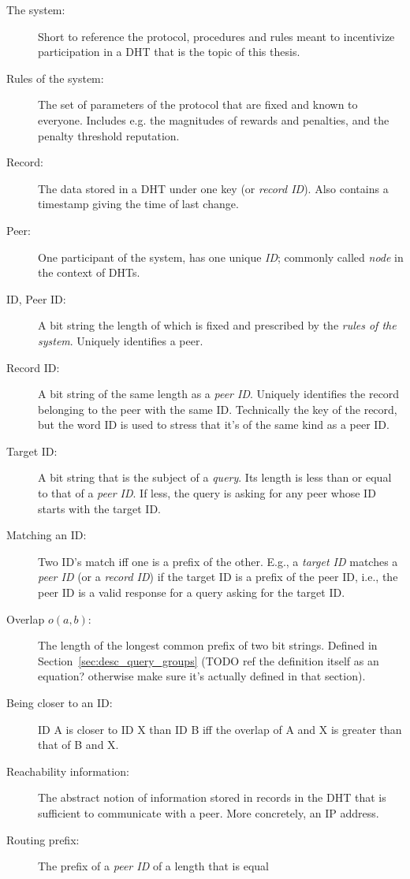 \begin{description}
\item[The system:] Short to reference the protocol, procedures and rules meant
to incentivize participation in a \ac{DHT} that is the topic of this thesis.
\item[Rules of the system:] The set of parameters of the protocol that are fixed
and known to everyone. Includes e.g. the magnitudes of rewards and penalties,
and the penalty threshold reputation.
\item[Record:] The data stored in a \ac{DHT} under one key (or \emph{record
ID}). Also contains a timestamp giving the time of last change.
\item[Peer:] One participant of the system, has one unique \emph{ID}; commonly
called \emph{node} in the context of \acp{DHT}.
\item[ID, Peer ID:] A bit string the length of which is fixed and prescribed by
the \emph{rules of the system}. Uniquely identifies a peer.
\item[Record ID:] A bit string of the same length as a \emph{peer ID}. Uniquely
identifies the record belonging to the peer with the same ID. Technically the
key of the record, but the word ID is used to stress that it's of the same kind
as a peer ID.
\item[Target ID:] A bit string that is the subject of a \emph{query}. Its length
is less than or equal to that of a \emph{peer ID}. If less, the query is asking
for any peer whose ID starts with the target ID.
\item[Matching an ID:] Two ID's match iff one is a prefix of the other. E.g., a
\emph{target ID} matches a \emph{peer ID} (or a \emph{record ID}) if the target
ID is a prefix of the peer ID, i.e., the peer ID is a valid response for a query
asking for the target ID.
\item[Overlap $o(a, b)$:] The length of the longest common prefix of two bit
strings. Defined in Section~\ref{sec:desc_query_groups} (TODO ref the
definition itself as an equation? otherwise make sure it's actually defined in
that section).
\item[Being closer to an ID:] ID A is closer to ID X than ID B iff the overlap
of A and X is greater than that of B and X.
\item[Reachability information:] The abstract notion of information stored in
records in the \ac{DHT} that is sufficient to communicate with a peer. More
concretely, an IP address.
\item[Routing prefix:] The prefix of a \emph{peer ID} of a length that is equal

\end{description}
